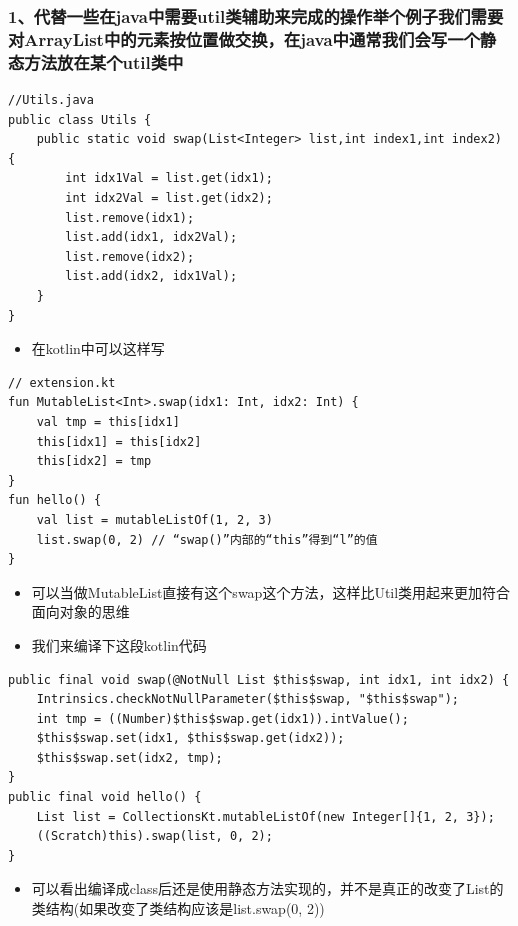 \documentclass[9pt, b5paper]{article}
\begin{document}
\subsubsection{1、代替一些在java中需要util类辅助来完成的操作举个例子我们需要对ArrayList中的元素按位置做交换，在java中通常我们会写一个静态方法放在某个util类中}
\label{sec-7-7-1}
\begin{verbatim}
//Utils.java
public class Utils {
    public static void swap(List<Integer> list,int index1,int index2) {
        int idx1Val = list.get(idx1);
        int idx2Val = list.get(idx2);
        list.remove(idx1);
        list.add(idx1, idx2Val);
        list.remove(idx2);
        list.add(idx2, idx1Val);
    }
}
\end{verbatim}
\begin{itemize}
\item 在kotlin中可以这样写
\end{itemize}
\begin{verbatim}
// extension.kt
fun MutableList<Int>.swap(idx1: Int, idx2: Int) {
    val tmp = this[idx1]
    this[idx1] = this[idx2]
    this[idx2] = tmp
}
fun hello() {
    val list = mutableListOf(1, 2, 3)
    list.swap(0, 2) // “swap()”内部的“this”得到“l”的值
}
\end{verbatim}
\begin{itemize}
\item 可以当做MutableList直接有这个swap这个方法，这样比Util类用起来更加符合面向对象的思维
\item 我们来编译下这段kotlin代码
\end{itemize}
\begin{verbatim}
public final void swap(@NotNull List $this$swap, int idx1, int idx2) {
    Intrinsics.checkNotNullParameter($this$swap, "$this$swap");
    int tmp = ((Number)$this$swap.get(idx1)).intValue();
    $this$swap.set(idx1, $this$swap.get(idx2));
    $this$swap.set(idx2, tmp);
}
public final void hello() {
    List list = CollectionsKt.mutableListOf(new Integer[]{1, 2, 3});
    ((Scratch)this).swap(list, 0, 2);
}
\end{verbatim}
\begin{itemize}
\item 可以看出编译成class后还是使用静态方法实现的，并不是真正的改变了List的类结构(如果改变了类结构应该是list.swap(0, 2))
\end{itemize}
\end{document}
